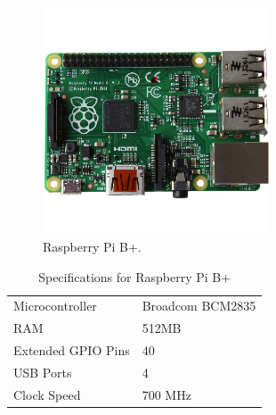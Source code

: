 \begin{figure}[h!]
\centering
\includegraphics[width=0.6\textwidth]{chapters/analysis/figs/raspberry-pi-model-b-plus.png}
\caption{Raspberry Pi B+\cite{pibplus}.}
\label{fig:pibplus}
\end{figure}

\begin{table}[h!]
\begin{tabular}{| l | l |}
\hline
Microcontroller & Broadcom BCM2835\\
RAM & 512MB\\
Extended GPIO Pins & 40\\
USB Ports & 4\\
Clock Speed & 700 MHz\\
\hline
\end{tabular}
\caption{Specifications for Raspberry Pi B+}
\end{table}
\label{tab:pibplusspec}